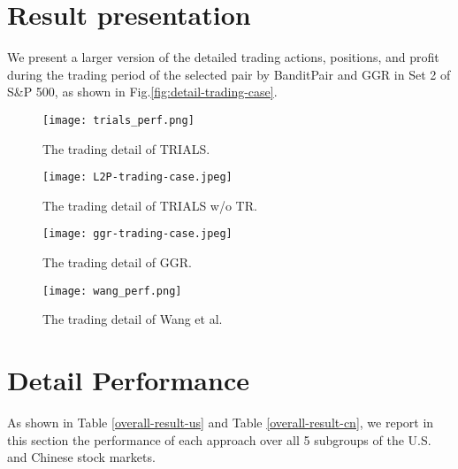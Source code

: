 \documentclass[sigconf]{acmart}
\begin{document}
\section{Result presentation}
\label{app:result-presentation}
We present a larger version of the detailed trading actions, positions, and profit during the trading period of the selected pair by BanditPair and GGR in Set 2 of S\&P 500, as shown in Fig.\ref{fig:detail-trading-case}.
\begin{figure*}[htb]
\centering
\begin{subfigure}[b]{.8\textwidth}
\centering
\texttt{[image: trials\_perf.png]}
\caption{The trading detail of TRIALS.}
\label{fig:detail-trading-case:TRIALS}
\end{subfigure}
\hfill
\begin{subfigure}[b]{.8\textwidth}
\centering
\texttt{[image: L2P-trading-case.jpeg]}
\caption{The trading detail of TRIALS w/o TR.}
\label{fig:detail-trading-case:L2P}
\end{subfigure}
\hfill
\begin{subfigure}[b]{.8\textwidth}
\centering
\texttt{[image: ggr-trading-case.jpeg]}
\caption{The trading detail of GGR.}
\label{fig:detail-trading-case:ggr}
\end{subfigure}
\hfill
\begin{subfigure}[b]{.8\textwidth}
\centering
\texttt{[image: wang\_perf.png]}
\caption{The trading detail of Wang et al.}
\label{fig:detail-trading-case:wang}
\end{subfigure}
\hfill
\caption{The trading details}
\label{fig:detail-trading-case}
\end{figure*}


\section{Detail Performance}
\label{app:detail-performance}
As shown in Table \ref{overall-result-us} and Table \ref{overall-result-cn}, we report in this section the performance of each approach over all 5 subgroups of the U.S. and Chinese stock markets.
\end{document}
